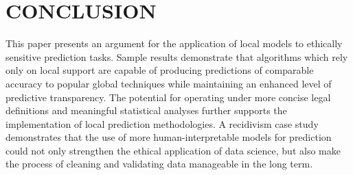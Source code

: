 \documentclass[conference]{IEEEtran}
\begin{document}

\section{CONCLUSION}
\label{sec:conclusion}

This paper presents an argument for the application of local models to ethically sensitive prediction tasks. Sample results demonstrate that algorithms which rely only on local support are capable of producing predictions of comparable accuracy to popular global techniques while maintaining an enhanced level of predictive transparency. The potential for operating under more concise legal definitions and meaningful statistical analyses further supports the implementation of local prediction methodologies. A recidivism case study demonstrates that the use of more human-interpretable models for prediction could not only strengthen the ethical application of data science, but also make the process of cleaning and validating data manageable in the long term.




\end{document}
